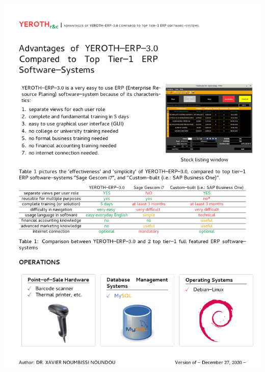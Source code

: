 \includegraphics[scale=0.93]{../yeroth-erp-document-comparison/yeroth-erp-document-comparison.pdf}

